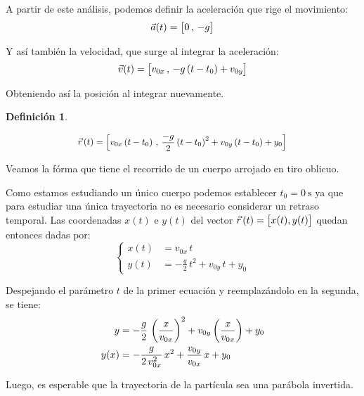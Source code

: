 \documentclass[a5paper,12pt,twoside]{book}
\newtheorem{defn}{{Definición}}[chapter]
\begin{document}
A partir de este análisis, podemos definir la aceleración que rige el movimiento:
\begin{equation*}
    \Vec{a}(t) = { \begin{bmatrix} 0 \, , \, -g \end{bmatrix} }
\end{equation*}

Y así también la velocidad, que surge al integrar la aceleración:
\begin{equation*}
    \Vec{v}(t) = { \begin{bmatrix} v_{0x} \, , \, -g \left(t-t_0\right) + v_{0y} \end{bmatrix} }
\end{equation*}

Obteniendo así la posición al integrar nuevamente.

\begin{mdframed}[style=MyFrame1]
    \begin{defn}
    \end{defn}
    \begin{equation*}
        \scale{0.92}{
        \xyz(t) = \sqb{v_{0x} \left(t-t_0\right) \, , \, \frac{-g}{2} \left(t-t_0\right)^2 + v_{0y} \left(t-t_0\right) + y_0}
        }
    \end{equation*}
\end{mdframed}

Veamos la fórma que tiene el recorrido de un cuerpo arrojado en tiro oblicuo.

Como estamos estudiando un único cuerpo podemos establecer $t_0=\SI{0}{\second}$ ya que para estudiar una única trayectoria no es necesario considerar un retraso temporal. Las coordenadas $x(t)$ e $y(t)$ del vector $\vec{r}\hspace{0.05cm}(t) = { \begin{bmatrix} x(t),y(t) \end{bmatrix} }$ quedan entonces dadas por:
\begin{equation*}
    \left\{
    \begin{aligned}
        x(t) &= v_{0x} \, t
        \\
        y(t) &= -\frac{g}{2} \, t^2 + v_{0y} \, t + y_0
    \end{aligned}
    \right.
\end{equation*}

Despejando el parámetro $t$ de la primer ecuación y reemplazándolo en la segunda, se tiene:
\begin{align}
    y &= -\frac{g}{2} \, \left(\frac{x}{v_{0x}}\right)^2 + v_{0y} \left(\frac{x}{v_{0x}}\right) + y_0
    \notag
    \\
    y(x) &= -\frac{g}{2 \, v_{0x}^2} \, x^2 + \frac{v_{0y}}{v_{0x}} \, x + y_0
    \label{eqn:oblicuoCurva}
\end{align}

Luego, es esperable que la trayectoria de la partícula sea una parábola invertida.
\end{document}
